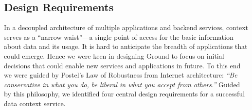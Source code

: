 \documentclass{sig-alternate}
\begin{document}







\subsection{Design Requirements}


In a decoupled architecture of multiple applications and backend services, context serves as a ``narrow waist''---a single point of access for the basic information about data and its usage. It is hard to anticipate the breadth of applications that could emerge.
Hence we were keen in designing Ground to focus on initial decisions that could enable new services and applications in future. 
To this end we were guided by Postel's Law of Robustness from Internet architecture: \emph{``Be conservative in what you do, be liberal in what you accept from others.''}  %
Guided by this philosophy, we identified four central design requirements for a successful data context service.
\end{document}
